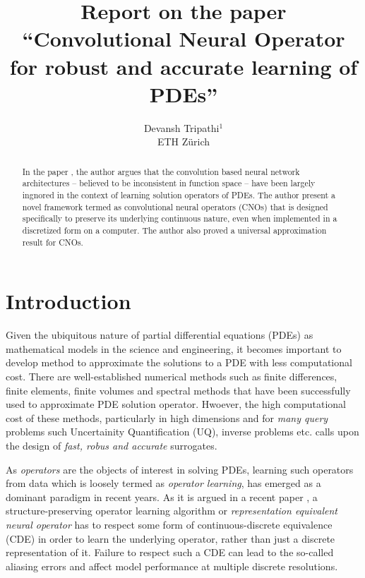 \documentclass[reqno,10pt]{amsart}
\title{Report on the paper ``Convolutional Neural Operator for robust and accurate learning of PDEs''}
\author{Devansh Tripathi$^1$ \\ ETH Z\lowercase{\"urich}}
\theoremstyle{plain}
\theoremstyle{definition}
\begin{document}

\begin{abstract}
    In the paper \cite{BR2023}, the author argues that the convolution based neural network architectures -- believed to be inconsistent in function space -- have been largely ingnored in the context of learning solution operators of PDEs. The author present a novel framework termed as convolutional neural operators (CNOs) that is designed specifically to preserve its underlying continuous nature, even when implemented in a discretized form on a computer. The author also proved a universal approximation result for CNOs.
\end{abstract}
\maketitle
\section{\bf \large Introduction}
    Given the ubiquitous nature of partial differential equations (PDEs) as mathematical models in the science and engineering, it becomes important to develop method to approximate the solutions to a PDE with less computational cost. There are well-established numerical methods such as finite differences, finite elements, finite volumes and spectral methods that have been successfully used to approximate PDE solution operator. Hwoever, the high computational cost of these methods, particularly in high dimensions and for {\it many query} problems such Uncertainity Quantification (UQ), inverse problems etc. calls upon the design of {\it fast, robus and accurate} surrogates.

    \noindent As {\it operators} are the objects of interest in solving PDEs, learning such operators from data which is loosely termed as {\it operator learning}, has emerged as a dominant paradigm in recent years. As it is argued in a recent paper \cite{FB2023}, a structure-preserving operator learning algorithm or {\it representation equivalent neural operator} has to respect some form of continuous-discrete equivalence (CDE) in order to learn the underlying operator, rather than just a discrete representation of it. Failure to respect such a CDE can lead to the so-called aliasing errors \cite{FB2023} and affect model performance at multiple discrete resolutions.
\end{document}
